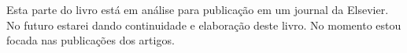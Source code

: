 \documentclass{book}
\begin{document}
Esta parte do livro está em análise para publicação em um journal da Elsevier. \\

No futuro estarei dando continuidade e elaboração deste livro. No momento estou focada nas publicações dos artigos. \\


%
%




\end{document}
